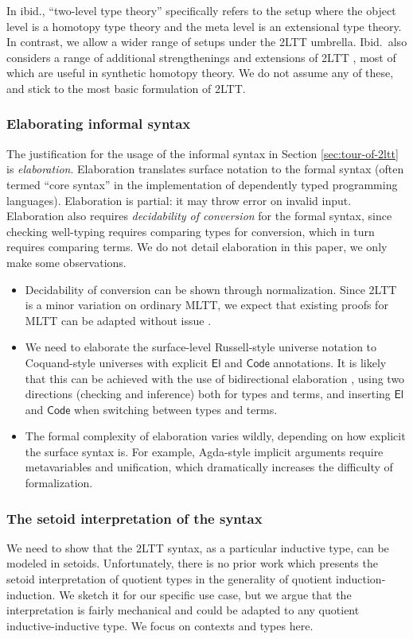 \documentclass[acmsmall,review]{acmart}
\newcommand{\msf}[1]{\mathsf{#1}}
\newcommand{\Code}{\msf{Code}}
\newcommand{\El}{\msf{El}}
\theoremstyle{remark}
\begin{document}
In ibid., ``two-level type theory'' specifically refers to the setup
where the object level is a homotopy type theory and the meta level is an
extensional type theory. In contrast, we allow a wider range of setups under the
2LTT umbrella. Ibid.\ also considers a range of additional
strengthenings and extensions of 2LTT \cite[Section~2.4]{twolevel}, most of which
are useful in synthetic homotopy theory. We do not assume any of these, and
stick to the most basic formulation of 2LTT.

\subsubsection{Elaborating informal syntax}
The justification for the usage of the informal syntax in Section
\ref{sec:tour-of-2ltt} is \emph{elaboration}. Elaboration translates surface
notation to the formal syntax (often termed ``core syntax'' in the
implementation of dependently typed programming languages). Elaboration is
partial: it may throw error on invalid input. Elaboration also requires
\emph{decidability of conversion} for the formal syntax, since checking
well-typing requires comparing types for conversion, which in turn requires
comparing terms.  We do not detail elaboration in this paper, we only make
some observations.
\begin{itemize}
\item Decidability of conversion can be shown through normalization. Since 2LTT
      is a minor variation on ordinary MLTT, we expect that existing proofs for MLTT
      can be adapted without issue \cite{coquand2018canonicity,decidableconv}.
\item We need to elaborate the surface-level Russell-style universe notation to
      Coquand-style universes with explicit $\El$ and $\Code$ annotations. It is
      likely that this can be achieved with the use of bidirectional elaboration
      \cite{DBLP:journals/csur/DunfieldK21}, using two directions (checking and
      inference) both for types and terms, and inserting $\El$ and $\Code$ when
      switching between types and terms.
\item The formal complexity of elaboration varies wildly, depending on how
      explicit the surface syntax is. For example, Agda-style implicit arguments
      require metavariables and unification, which dramatically increases the
      difficulty of formalization.
\end{itemize}

\subsubsection{The setoid interpretation of the syntax}\label{sec:2lttsetoid} We need to show
that the 2LTT syntax, as a particular inductive type, can be modeled in setoids.
Unfortunately, there is no prior work which presents the setoid interpretation
of quotient types in the generality of quotient induction-induction. We sketch
it for our specific use case, but we argue that the interpretation is fairly
mechanical and could be adapted to any quotient inductive-inductive type.
We focus on contexts and types here.
\end{document}
